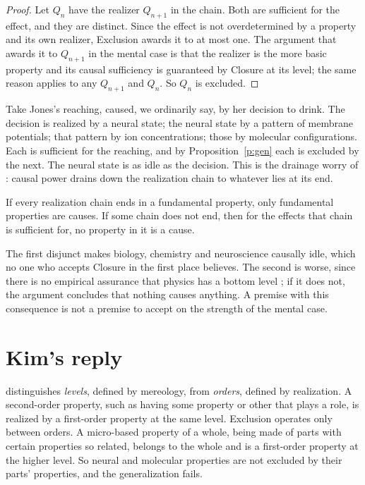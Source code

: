 \documentclass{situationist-preprint}
\begin{document}
\begin{proof}
Let $Q_n$ have the realizer $Q_{n+1}$ in the chain. Both are sufficient for the effect, and they are distinct. Since the effect is not overdetermined by a property and its own realizer, Exclusion awards it to at most one. The argument that awards it to $Q_{n+1}$ in the mental case is that the realizer is the more basic property and its causal sufficiency is guaranteed by Closure at its level; the same reason applies to any $Q_{n+1}$ and $Q_n$. So $Q_n$ is excluded.
\end{proof}

Take Jones's reaching, caused, we ordinarily say, by her decision to drink. The decision is realized by a neural state; the neural state by a pattern of membrane potentials; that pattern by ion concentrations; those by molecular configurations. Each is sufficient for the reaching, and by Proposition~\ref{p:gen} each is excluded by the next. The neural state is as idle as the decision. This is the drainage worry of \citet{Block2003}: causal power drains down the realization chain to whatever lies at its end.

\begin{corollary}\label{c:drain}
If every realization chain ends in a fundamental property, only fundamental properties are causes. If some chain does not end, then for the effects that chain is sufficient for, no property in it is a cause.
\end{corollary}

The first disjunct makes biology, chemistry and neuroscience causally idle, which no one who accepts Closure in the first place believes. The second is worse, since there is no empirical assurance that physics has a bottom level \citep{Schaffer2003}; if it does not, the argument concludes that nothing causes anything. A premise with this consequence is not a premise to accept on the strength of the mental case.

\section{Kim's reply}

\begin{objection}
\citet{Kim1998} distinguishes \emph{levels}, defined by mereology, from \emph{orders}, defined by realization. A second-order property, such as having some property or other that plays a role, is realized by a first-order property at the same level. Exclusion operates only between orders. A micro-based property of a whole, being made of parts with certain properties so related, belongs to the whole and is a first-order property at the higher level. So neural and molecular properties are not excluded by their parts' properties, and the generalization fails.
\end{objection}
\end{document}
